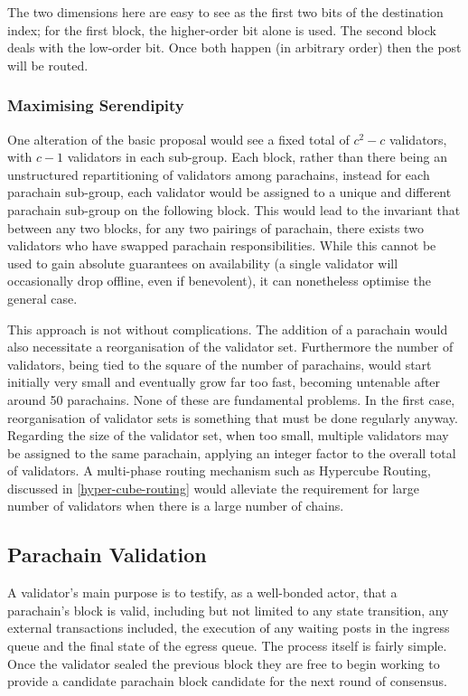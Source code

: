 \documentclass[9pt,oneside]{amsart}
\begin{document}
\begin{multicols}{2}
 The two dimensions here are easy to see as the first two bits of the destination index; for the first block, the higher-order bit alone is used. The second block deals with the low-order bit. Once both happen (in arbitrary order) then the post will be routed.

\subsubsection{Maximising Serendipity}

 One alteration of the basic proposal would see a fixed total of $c^2-c$ validators, with $c-1$ validators in each sub-group. Each block, rather than there being an unstructured repartitioning of validators among parachains, instead for each parachain sub-group, each validator would be assigned to a unique and different parachain sub-group on the following block. This would lead to the invariant that between any two blocks, for any two pairings of parachain, there exists two validators who have swapped parachain responsibilities. While this cannot be used to gain absolute guarantees on availability (a single validator will occasionally drop offline, even if benevolent), it can nonetheless optimise the general case.

 This approach is not without complications. The addition of a parachain would also necessitate a reorganisation of the validator set. Furthermore the number of validators, being tied to the square of the number of parachains, would start initially very small and eventually grow far too fast, becoming untenable after around 50 parachains. None of these are fundamental problems. In the first case, reorganisation of validator sets is something that must be done regularly anyway. Regarding the size of the validator set, when too small, multiple validators may be assigned to the same parachain, applying an integer factor to the overall total of validators. A multi-phase routing mechanism such as Hypercube Routing, discussed
in \ref{hyper-cube-routing} would alleviate the requirement for large number of validators when there is a large number of chains.

\subsection{Parachain Validation}
\label{parachain-validation}

 A validator's main purpose is to testify, as a well-bonded actor, that a parachain's block is valid, including but not limited to any state transition, any external transactions included, the execution of any waiting posts in the ingress queue and the final state of the egress queue. The process itself is fairly simple. Once the validator sealed the previous block they are free to begin working to provide a candidate parachain block candidate for the next round of consensus.


\end{multicols}
\end{document}
